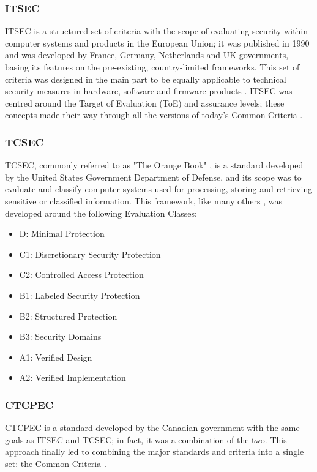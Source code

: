 \subsubsection{ITSEC}
ITSEC is a structured set of criteria with the scope of evaluating security within computer systems and products in the European Union; it was published in 1990 and was developed by France, Germany, Netherlands and UK governments, basing its features on the pre-existing, country-limited frameworks. This set of criteria was designed in the main part to be equally applicable to technical security measures in hardware, software and firmware products \cite{ITSEC}. ITSEC was centred around the Target of Evaluation (ToE) and assurance levels; these concepts made their way through all the versions of today's Common Criteria \cite{infrastructure2002common}.

\subsubsection{TCSEC}
TCSEC, commonly referred to as "The Orange Book" \cite{orangeBook}\cite{orangeBookDeath}, is a standard developed by the United States Government Department of Defense, and its scope was to evaluate and classify computer systems used for processing, storing and retrieving sensitive or classified information. This framework, like many others \cite{infrastructure2002common}\cite{ITSEC}, was developed around the following Evaluation Classes: 
\begin{itemize}
    \item D: Minimal Protection
    \item C1: Discretionary Security Protection
    \item C2: Controlled Access Protection
    \item B1: Labeled Security Protection
    \item B2: Structured Protection
    \item B3: Security Domains
    \item A1: Verified Design
    \item A2: Verified Implementation
\end{itemize}

\subsubsection{CTCPEC}
CTCPEC is a standard developed by the Canadian government with the same goals as ITSEC and TCSEC; in fact, it was a combination of the two. This approach finally led to combining the major standards and criteria into a single set: the Common Criteria \cite{CTCPEC}.

